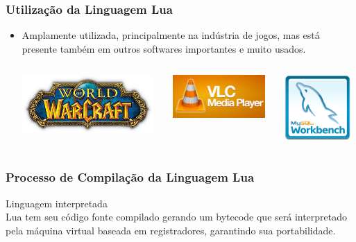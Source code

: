 \documentclass{beamer}
\begin{document}
\begin{frame}
    \frametitle{Utilização da Linguagem Lua}
    \begin{itemize}
        \item Amplamente utilizada, principalmente na indústria de jogos, mas está presente também em outros softwares importantes e muito usados.
        \begin{columns}
            \begin{column}{5cm}
                \includegraphics[width=5cm]{images/wow.jpg}
            \end{column}
            \begin{column}{4cm}
                \includegraphics[width=3.5cm]{images/vlc.jpg}
            \end{column}
            \begin{column}{4cm}
                \includegraphics[width=2.5cm]{images/mysql_workbench.png}
            \end{column}
        \end{columns}
    \end{itemize}
\end{frame}

\begin{frame}
    \frametitle{Processo de Compilação da Linguagem Lua}
        Linguagem interpretada\\
        
        Lua tem seu código fonte compilado gerando um bytecode que será interpretado pela máquina virtual baseada em registradores, garantindo sua portabilidade.
    
\end{frame}
\end{document}

